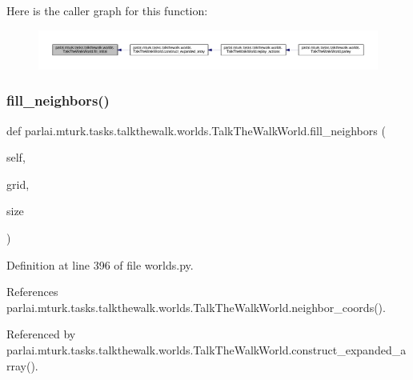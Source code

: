 Here is the caller graph for this function\+:
\nopagebreak
\begin{figure}[H]
\begin{center}
\leavevmode
\includegraphics[width=350pt]{classparlai_1_1mturk_1_1tasks_1_1talkthewalk_1_1worlds_1_1TalkTheWalkWorld_adcba21d8dd2fd552fc3c7c777e704397_icgraph}
\end{center}
\end{figure}
\mbox{\label{classparlai_1_1mturk_1_1tasks_1_1talkthewalk_1_1worlds_1_1TalkTheWalkWorld_a44d5136e6f6808929e818041011d8e71}} 
\subsubsection{\texorpdfstring{fill\+\_\+neighbors()}{fill\_neighbors()}}
{\footnotesize\ttfamily def parlai.\+mturk.\+tasks.\+talkthewalk.\+worlds.\+Talk\+The\+Walk\+World.\+fill\+\_\+neighbors (\begin{DoxyParamCaption}\item[{}]{self,  }\item[{}]{grid,  }\item[{}]{size }\end{DoxyParamCaption})}



Definition at line 396 of file worlds.\+py.



References parlai.\+mturk.\+tasks.\+talkthewalk.\+worlds.\+Talk\+The\+Walk\+World.\+neighbor\+\_\+coords().



Referenced by parlai.\+mturk.\+tasks.\+talkthewalk.\+worlds.\+Talk\+The\+Walk\+World.\+construct\+\_\+expanded\+\_\+array().


